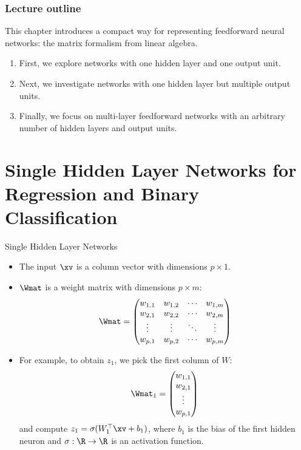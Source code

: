







\begin{frame}
\frametitle{Lecture outline}
\lz
This chapter introduces a compact way for representing feedforward neural networks: the matrix formalism from linear algebra.
\lz
\lz

\begin{enumerate}
\item First, we explore networks with one hidden layer and one output unit.
\lz
\item Next, we investigate networks with one hidden layer but multiple output units.
\lz
\item Finally, we focus on multi-layer feedforward networks with an arbitrary number of hidden layers and output units.
\end{enumerate}
\end{frame}

\section{Single Hidden Layer Networks for Regression and Binary Classification}

\begin{vbframe}{Single Hidden Layer Networks}

\begin{itemize}
\item The input $\xv$ is a column vector with dimensions $p \times 1$. 
\item $\Wmat$ is a weight matrix with dimensions $p \times m$:
$$\Wmat =
     \begin{pmatrix}
      w_{1,1} & w_{1,2} & \cdots & w_{1,m} \\
      w_{2,1} & w_{2,2} & \cdots & w_{2,m} \\
      \vdots  & \vdots  & \ddots & \vdots  \\
      w_{p,1} & w_{p,2} & \cdots & w_{p,m}
     \end{pmatrix}$$
\item For example, to obtain $z_1$, we pick the first column of $W$:
    $$\Wmat_1 =
     \begin{pmatrix}
      w_{1,1} \\
      w_{2,1} \\
      \vdots  \\
      w_{p,1}
     \end{pmatrix}$$
and compute $z_1 = \sigma(W_1^\top \xv + b_1)$, where $b_1$ is the bias of the first hidden neuron and $\sigma: \R \to \R$ is an activation function. 
\end{itemize}
\end{vbframe}

